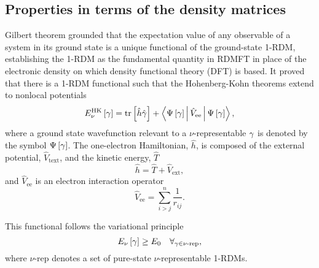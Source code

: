 \subsection{Properties in terms of the density matrices} %
\label{sub:Properties in terms of the density matrices}

Gilbert theorem grounded that the expectation
value of any observable of a system in its ground state is a unique functional
of the ground-state 1-RDM, establishing the 1-RDM as the fundamental quantity
in RDMFT in place of the electronic density on which density functional theory
(DFT) is based.
It proved that there is a 1-RDM functional
such that the Hohenberg-Kohn theorems extend to 
nonlocal potentials
\begin{equation} \label{ec:HK-functional}
    \func{E_{\nu}^{\text{HK}}}{\fordm} = 
    \mytrace{\hat{h} \hat{\fordm}} + 
    \Braket{\func{\Psi}{\fordm} | \hat{V}_{\text{ee}} | \func{\Psi}{\fordm}}
    ,
\end{equation}
where a ground state wavefunction relevant to a $\nu$-representable $\gamma$ 
is denoted by the symbol $\Psi \left[ \gamma \right]$.
The one-electron Hamiltonian, $\hat{h}$, is composed of the external
potential, $\hat{V}_{\text{text}}$, and the kinetic energy, $\hat{T}$
\begin{equation}
    \hat{h} = \hat{T} + \hat{V}_{\text{ext}}
        ,
\end{equation}
and $\hat{V}_{\text{ee}}$ is an electron interaction operator 
\begin{equation}
    \hat{V}_{\text{ee}} = 
    \sum_{i>j}^{n} \frac{1}{r_{ij}}
    .
\end{equation}

This functional follows the variational principle 
\begin{equation} \label{ec:var-princ-nu-rep}
    E_{\nu} \left[ \gamma \right] \ge E_0 \quad \forall_{\gamma \in \text{$\nu$-rep}}
    ,
\end{equation}
where $\nu$-rep denotes a set of pure-state $\nu$-representable 1-RDMs.

